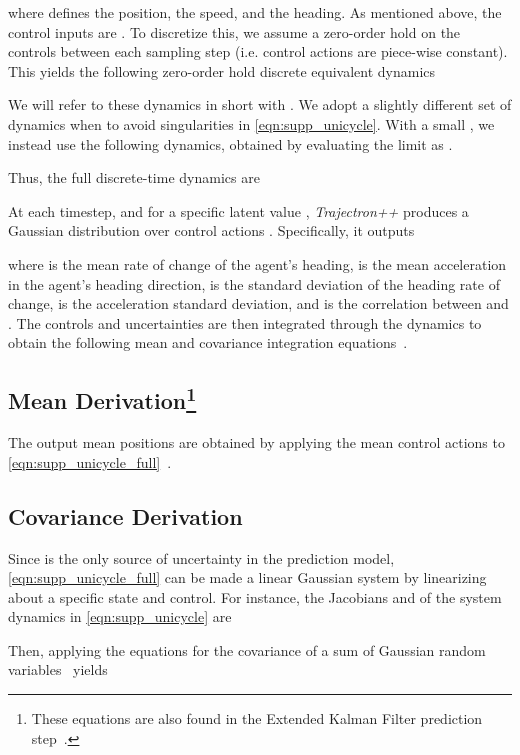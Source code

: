 \documentclass[runningheads]{llncs}
\newcommand{\algname}{\mbox{Trajectron++}}
\newcommand{\emphalgname}{\emph{\algname}}
\begin{document}
where  defines the position,  the speed, and  the heading. As mentioned above, the control inputs are . To discretize this, we assume a zero-order hold on the controls between each sampling step (i.e. control actions are piece-wise constant). This yields the following zero-order hold discrete equivalent dynamics

We will refer to these dynamics in short with . We adopt a slightly different set of dynamics when  to avoid singularities in \cref{eqn:supp_unicycle}. With a small , we instead use the following dynamics, obtained by evaluating the limit as .

Thus, the full discrete-time dynamics are



At each timestep, and for a specific latent value , \emphalgname{} produces a Gaussian distribution over control actions . Specifically, it outputs

where  is the mean rate of change of the agent's heading,  is the mean acceleration in the agent's heading direction,  is the standard deviation of the heading rate of change,  is the acceleration standard deviation, and  is the correlation between  and . The controls  and uncertainties  are then integrated through the dynamics to obtain the following mean and covariance integration equations~\cite{ThrunBurgardEtAl2005EKF}.



\subsection{Mean Derivation\protect\footnote{These equations are also found in the Extended Kalman Filter prediction step~\cite{ThrunBurgardEtAl2005EKF}.}}
The output mean positions are obtained by applying the mean control actions to \cref{eqn:supp_unicycle_full}~\cite{ThrunBurgardEtAl2005EKF}.

\subsection{Covariance Derivation\protect\footnotemark[3]}
Since  is the only source of uncertainty in the prediction model, \cref{eqn:supp_unicycle_full} can be made a linear Gaussian system by linearizing about a specific state and control. For instance, the Jacobians  and  of the system dynamics in \cref{eqn:supp_unicycle} are

Then, applying the equations for the covariance of a sum of Gaussian random variables~\cite{ThrunBurgardEtAl2005EKF} yields
\end{document}
